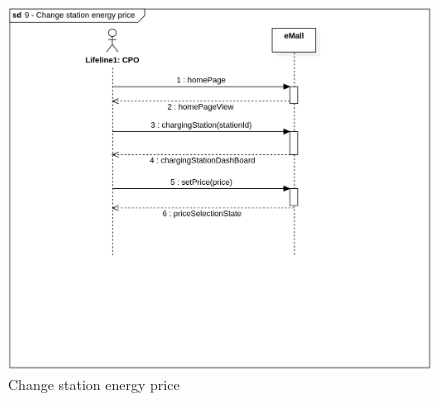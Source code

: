 \begin{figure}[H]
    \begin{center}
        \includegraphics[width=\textwidth]{img/sequence/energy-price.png}
        \caption{Change station energy price}
    \end{center}
\end{figure}
\newpage

